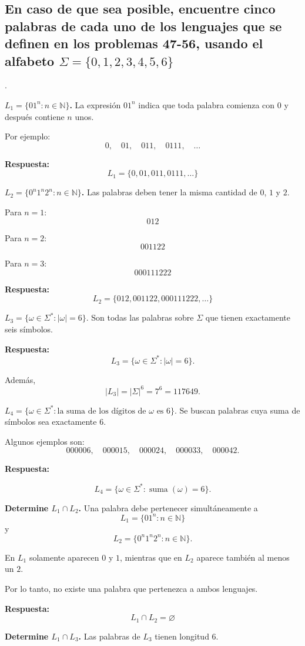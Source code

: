 \documentclass[12pt]{article}
\begin{document}
\subsection{En caso de que sea posible, encuentre cinco palabras de cada uno de los lenguajes que se definen en los problemas 47-56, usando el alfabeto $\Sigma = \{0,1,2,3,4,5,6\}$}.

\textbf{$L_1=\{01^n:n\in\mathbb{N}\}$.}
La expresión $01^n$ indica que toda palabra comienza con $0$ y después
contiene $n$ unos.

Por ejemplo:
\[
0,\quad 01,\quad 011,\quad 0111,\quad \ldots
\]

\textbf{Respuesta:}
\[
L_1=\{0,01,011,0111,\ldots\}
\]

\textbf{$L_2=\{0^n1^n2^n:n\in\mathbb{N}\}$.}
Las palabras deben tener la misma cantidad de $0$, $1$ y $2$.

Para $n=1$:
\[
012
\]

Para $n=2$:
\[
001122
\]

Para $n=3$:
\[
000111222
\]

\textbf{Respuesta:}
\[
L_2=\{012,001122,000111222,\ldots\}
\]

\textbf{$L_3=\{\omega\in\Sigma^*:|\omega|=6\}.$}
Son todas las palabras sobre $\Sigma$ que tienen exactamente seis símbolos.

\textbf{Respuesta:}
\[
L_3=\{\omega\in\Sigma^*:|\omega|=6\}.
\]

Además,
\[
|L_3|=|\Sigma|^6=7^6=117649.
\]

\textbf{$L_4=\{\omega\in\Sigma^*:\text{la suma de los dígitos de }\omega
\text{ es }6\}.$}
Se buscan palabras cuya suma de símbolos sea exactamente $6$.

Algunos ejemplos son:
\[
000006,\quad 000015,\quad 000024,\quad
000033,\quad 000042.
\]

\textbf{Respuesta:}

\[
L_4=\{\omega\in\Sigma^*:\operatorname{suma}(\omega)=6\}.
\]

\textbf{Determine $L_1\cap L_2$.}
Una palabra debe pertenecer simultáneamente a
\[
L_1=\{01^n:n\in\mathbb N\}
\]
y
\[
L_2=\{0^n1^n2^n:n\in\mathbb N\}.
\]

En $L_1$ solamente aparecen $0$ y $1$, mientras que en $L_2$
aparece también al menos un $2$.

Por lo tanto, no existe una palabra que pertenezca a ambos lenguajes.

\textbf{Respuesta:}
\[
\boxed{L_1\cap L_2=\varnothing}
\]

\textbf{Determine $L_1\cap L_3$.}
Las palabras de $L_3$ tienen longitud $6$.
\end{document}
